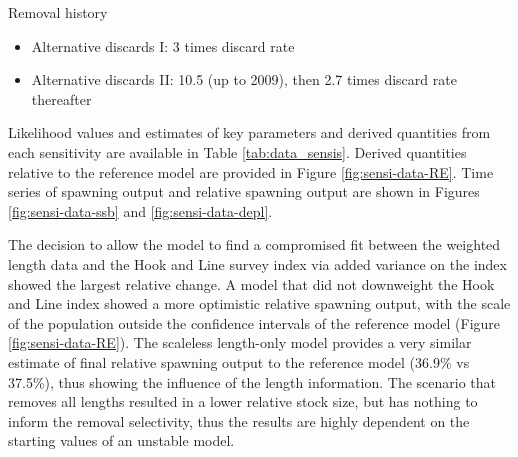 \documentclass[11pt,
  english,
  a4paper,
]{article}
\begin{document}
\begin{enumerate}
  Removal history

  \tagmcend\tagstructend\tagstructend


  \begin{itemize}
  \item


    Alternative discards I: 3 times discard rate

    \tagmcend\tagstructend\tagstructend

    \tagmcend\tagstructend\tagstructend
  \item


    Alternative discards II: 10.5 (up to 2009), then 2.7 times discard rate thereafter

    \tagmcend\tagstructend\tagstructend

    \tagmcend\tagstructend\tagstructend
  \end{itemize}

  \tagstructend
\end{enumerate}

\tagstructend


Likelihood values and estimates of key parameters and derived quantities from each sensitivity are available in Table \ref{tab:data_sensis}. Derived quantities relative to the reference model are provided in Figure \ref{fig:sensi-data-RE}. Time series of spawning output and relative spawning output are shown in Figures \ref{fig:sensi-data-ssb} and \ref{fig:sensi-data-depl}.

\leavevmode\tagmcend\tagstructend\par


The decision to allow the model to find a compromised fit between the weighted length data and the Hook and Line survey index via added variance on the index showed the largest relative change. A model that did not downweight the Hook and Line index showed a more optimistic relative spawning output, with the scale of the population outside the confidence intervals of the reference model (Figure \ref{fig:sensi-data-RE}). The scaleless length-only model provides a very similar estimate of final relative spawning output to the reference model (36.9\% vs 37.5\%), thus showing the influence of the length information. The scenario that removes all lengths resulted in a lower relative stock size, but has nothing to inform the removal selectivity, thus the results are highly dependent on the starting values of an unstable model.
\end{document}
